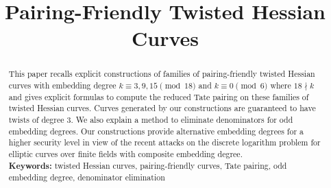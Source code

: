 \documentclass[11pt, a4paper]{llncs}
\newif\ifpublic
\begin{document}
\title{Pairing-Friendly Twisted Hessian Curves}


\ifpublic
\author{
Chitchanok Chuengsatiansup\inst{1}
\and
Chloe Martindale\inst{2}
}
\authorrunning{Chuengsatiansup, Martindale}

\institute{
ENS de Lyon and INRIA \\
46 All\'{e}e d'Italie 69364 Lyon Cedex 07, France \\
\email{chitchanok.chuengsatiansup@ens-lyon.fr}
\and
Department of Mathematics and Computer Science\\
Technische Universiteit Eindhoven\\
P.O. Box 513, 5600 MB Eindhoven, The Netherlands\\
\email{c.r.martindale@tue.nl}
}
\fi


\date{}
\maketitle
\begin{abstract}
This paper recalls explicit constructions of families of pairing-friendly twisted Hessian curves
with embedding degree $k \equiv 3,9,15 \pmod{18}$ and $k \equiv 0 \pmod{6}$ where $18 \nmid k$
and gives explicit formulas to compute the reduced Tate pairing on these families of twisted Hessian curves.
Curves generated by our constructions are guaranteed to have twists of degree 3.
We also explain a method to eliminate denominators for odd embedding degrees.
Our constructions provide alternative embedding degrees for a higher security level
in view of the recent attacks on the discrete logarithm problem for elliptic curves over finite fields with composite embedding degree.
\\[10pt]
\textbf{Keywords:}
twisted Hessian curves, pairing-friendly curves, Tate pairing, odd embedding degree, denominator elimination
\end{abstract}



%





%




\end{document}
